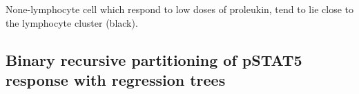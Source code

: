 {None-lymphocyte cell which respond to low doses of proleukin, tend to lie close to the lymphocyte cluster (black).}
{
}
%



\subsection{Binary recursive partitioning of pSTAT5 response with regression trees} 

